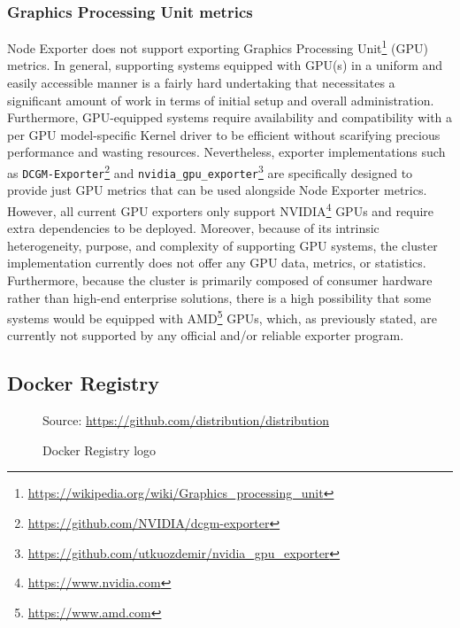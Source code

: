 \subsubsection{Graphics Processing Unit metrics}
\label{subsubsec:implementation_dependencies_node_exporter_graphics_processing_unit_metrics}

Node Exporter does not support exporting Graphics Processing Unit\footnote{\url{https://wikipedia.org/wiki/Graphics_processing_unit}}
(GPU) metrics. In general, supporting systems equipped with GPU(s) in a uniform
and easily accessible manner is a fairly hard undertaking that necessitates a
significant amount of work in terms of initial setup and overall administration.
Furthermore, GPU-equipped systems require availability and compatibility with a
per GPU model-specific Kernel driver to be efficient without scarifying precious
performance and wasting resources. Nevertheless, exporter implementations such
as \texttt{DCGM-Exporter}\footnote{\url{https://github.com/NVIDIA/dcgm-exporter}}
and \texttt{nvidia\_gpu\_exporter}\footnote{\url{https://github.com/utkuozdemir/nvidia_gpu_exporter}}
are specifically designed to provide just GPU metrics that can be used alongside
Node Exporter metrics. However, all current GPU exporters only support NVIDIA\footnote{\url{https://www.nvidia.com}}
GPUs and require extra dependencies to be deployed. Moreover, because of its
intrinsic heterogeneity, purpose, and complexity of supporting GPU systems, the cluster
implementation currently does not offer any GPU data, metrics, or statistics.
Furthermore, because the cluster is primarily composed of consumer hardware rather
than high-end enterprise solutions, there is a high possibility that some
systems would be equipped with AMD\footnote{\url{https://www.amd.com}} GPUs, which,
as previously stated, are currently not supported by any official and/or reliable
exporter program.

\subsection{Docker Registry}
\label{subsec:implementation_dependencies_docker_registry}

\begin{figure} %
  \centering
  \def\stackalignment{l} %
  {\scriptsize \parbox[t]{\linewidth}{ Source: \url{https://github.com/distribution/distribution}} }
  \caption{Docker Registry logo}
\end{figure}

